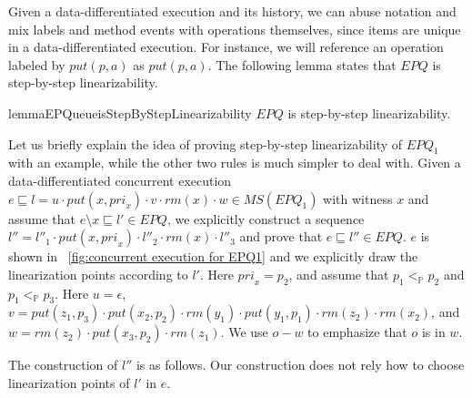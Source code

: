 Given a data-differentiated execution and its history, we can abuse notation and mix labels and method events with operations themselves, since items are unique in a data-differentiated execution. For instance, we will reference an operation labeled by $\textit{put}(p,a)$ as $\textit{put}(p,a)$. The following lemma states that $\textit{EPQ}$ is step-by-step linearizability.

\begin{restatable}{lemma}{EPQueueisStepByStepLinearizability}
\label{lemma:EPQ is step-by-step linearizability}
$\textit{EPQ}$ is step-by-step linearizability.
\end{restatable}

Let us briefly explain the idea of proving step-by-step linearizability of $\textit{EPQ}_1$ with an example, while the other two rules is much simpler to deal with. Given a data-differentiated concurrent execution $e \sqsubseteq l = u \cdot \textit{put}(x,\textit{pri}_x) \cdot v \cdot \textit{rm}(x) \cdot w \in \textit{MS}(\textit{EPQ}_1)$ with witness $x$ and assume that $e \setminus x \sqsubseteq l' \in \textit{EPQ}$, we explicitly construct a sequence $l''= l''_1 \cdot \textit{put}(x,\textit{pri}_x) \cdot l''_2 \cdot \textit{rm}(x) \cdot l''_3$ and prove that $e \sqsubseteq l'' \in \textit{EPQ}$. $e$ is shown in \figurename~\ref{fig:concurrent execution for EPQ1} and we explicitly draw the linearization points according to $l'$. Here $\textit{pri}_x=p_2$, and assume that $p_1 <_{\mathbb{P}} p_2$ and $p_1 <_{\mathbb{P}} p_3$. Here $u = \epsilon$, $v = \textit{put}(z_1,p_3) \cdot \textit{put}(x_2,p_2) \cdot \textit{rm}(y_1) \cdot \textit{put}(y_1,p_1) \cdot \textit{rm}(z_2) \cdot \textit{rm}(x_2)$, and $w=\textit{rm}(z_2) \cdot \textit{put}(x_3,p_2) \cdot \textit{rm}(z_1)$. We use $o-w$ to emphasize that $o$ is in $w$.

The construction of $l''$ is as follows. Our construction does not rely how to choose linearization points of $l'$ in $e$.

